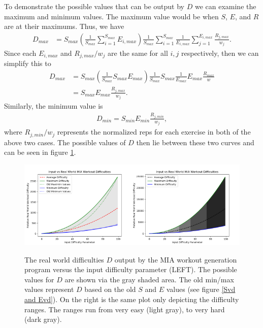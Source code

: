 To demonstrate the possible values that can be output by $D$ we can examine the maximum and minimum values. The maximum value would be when $S$, $E$, and $R$ are at their maximums. Thus, we have
\begin{align}
	D_{max} &= S_{max} \left(\frac{1}{S_{max}}\sum_{i=1}^{S_{max}}E_{i,max} \right)\frac{1}{S_{max}}\sum_{i=1}^{S_{max}}\frac{1}{E_{i,max}}\sum_{j=1}^{E_{i,max}}\frac{R_{j,max}}{w_j}.
\end{align}
Since each $E_{i,max}$ and $R_{j,max}/w_j$ are the same for all $i,j$ respectively, then we can simplify this to
\begin{align}
	D_{max} &= S_{max} \left(\frac{1}{S_{max}}S_{max}E_{max} \right)\frac{1}{S_{max}}S_{max}\frac{1}{E_{max}}E_{max}\frac{R_{max}}{w} \\
	&= S_{max} E_{max} \frac{R_{j,max}}{w_j}.
\end{align}
Similarly, the minimum value is 
\begin{align}
	D_{min} = S_{min} E_{min} \frac{R_{j,min}}{w_j},
\end{align}
where $R_{j,min}/w_j$ represents the normalized reps for each exercise in both of the above two cases. The possible values of $D$ then lie between these two curves and can be seen in figure \ref{Dvd}.

\begin{figure}[h]
	\centering
	\includegraphics[width=0.5\textwidth]{images/Dvd.png}\includegraphics[width=0.5\textwidth]{images/Dvdc.png}
	\caption{The real world difficulties $D$ output by the MIA workout generation program versus the input difficulty parameter (LEFT). The possible values for $D$ are shown via the gray shaded area. The old min/max values represent $D$ based on the old $S$ and $E$ values (see figure \ref{Svd and Evd}). On the right is the same plot only depicting the difficulty ranges. The ranges run from very easy (light gray), to very hard (dark gray).} \label{Dvd}
\end{figure}

